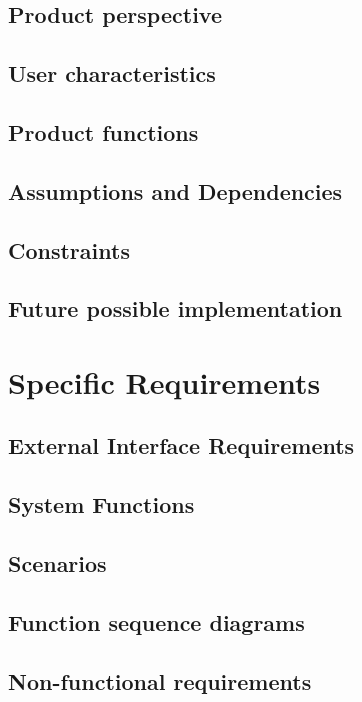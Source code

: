 \documentclass{article}
\begin{document}
	\subsection{Product perspective}
	
	
	\subsection{User characteristics}
	
	
		\subsection{Product functions}
	
	
	\subsection{Assumptions and Dependencies}
	
	
	\subsection{Constraints}
	
		
	\subsection{Future possible implementation}
	
	
	
\newpage	    
\section{Specific Requirements}

	\subsection{External Interface Requirements}
	
	
	\subsection{System Functions}
	
	
	\subsection{Scenarios}
	
	
	\subsection{Function sequence diagrams}
	
	
	\subsection{Non-functional requirements}
	
	
\end{document}
